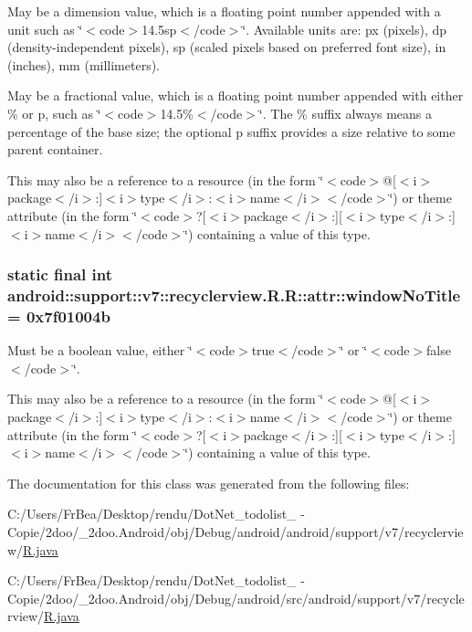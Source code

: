 May be a dimension value, which is a floating point number appended with a unit such as \char`\"{}$<$code$>$14.5sp$<$/code$>$\char`\"{}. Available units are: px (pixels), dp (density-independent pixels), sp (scaled pixels based on preferred font size), in (inches), mm (millimeters). 

May be a fractional value, which is a floating point number appended with either \% or p, such as \char`\"{}$<$code$>$14.5\%$<$/code$>$\char`\"{}. The \% suffix always means a percentage of the base size; the optional p suffix provides a size relative to some parent container. 

This may also be a reference to a resource (in the form \char`\"{}$<$code$>$@\mbox{[}$<$i$>$package$<$/i$>$:\mbox{]}$<$i$>$type$<$/i$>$:$<$i$>$name$<$/i$>$$<$/code$>$\char`\"{}) or theme attribute (in the form \char`\"{}$<$code$>$?\mbox{[}$<$i$>$package$<$/i$>$:\mbox{]}\mbox{[}$<$i$>$type$<$/i$>$:\mbox{]}$<$i$>$name$<$/i$>$$<$/code$>$\char`\"{}) containing a value of this type. \hypertarget{classandroid_1_1support_1_1v7_1_1recyclerview_1_1_r_1_1attr_21ddcdaea4b7864c5ce6933f5089a61d}{
\subsubsection[{windowNoTitle}]{\setlength{\rightskip}{0pt plus 5cm}static final int android::support::v7::recyclerview.R.R::attr::windowNoTitle = 0x7f01004b}}
\label{classandroid_1_1support_1_1v7_1_1recyclerview_1_1_r_1_1attr_21ddcdaea4b7864c5ce6933f5089a61d}


Must be a boolean value, either \char`\"{}$<$code$>$true$<$/code$>$\char`\"{} or \char`\"{}$<$code$>$false$<$/code$>$\char`\"{}. 

This may also be a reference to a resource (in the form \char`\"{}$<$code$>$@\mbox{[}$<$i$>$package$<$/i$>$:\mbox{]}$<$i$>$type$<$/i$>$:$<$i$>$name$<$/i$>$$<$/code$>$\char`\"{}) or theme attribute (in the form \char`\"{}$<$code$>$?\mbox{[}$<$i$>$package$<$/i$>$:\mbox{]}\mbox{[}$<$i$>$type$<$/i$>$:\mbox{]}$<$i$>$name$<$/i$>$$<$/code$>$\char`\"{}) containing a value of this type. 

The documentation for this class was generated from the following files:\begin{CompactItemize}
\item 
C:/Users/FrBea/Desktop/rendu/DotNet\_\-todolist\_ - Copie/2doo/\_\-2doo.Android/obj/Debug/android/android/support/v7/recyclerview/\hyperlink{android_2support_2v7_2recyclerview_2_r_8java}{R.java}\item 
C:/Users/FrBea/Desktop/rendu/DotNet\_\-todolist\_ - Copie/2doo/\_\-2doo.Android/obj/Debug/android/src/android/support/v7/recyclerview/\hyperlink{src_2android_2support_2v7_2recyclerview_2_r_8java}{R.java}\end{CompactItemize}
